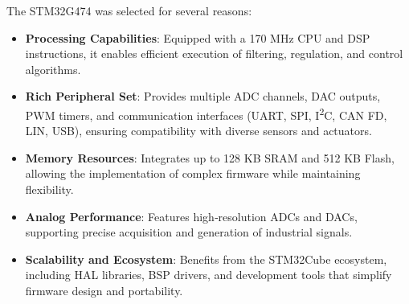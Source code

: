 The STM32G474 was selected for several reasons:
\begin{itemize}
    \item \textbf{Processing Capabilities}: Equipped with a 170 MHz CPU and DSP
    instructions, it enables efficient execution of filtering, regulation, and control
    algorithms.
    \item \textbf{Rich Peripheral Set}: Provides multiple ADC channels, DAC outputs,
    PWM timers, and communication interfaces (UART, SPI, I\textsuperscript{2}C, CAN FD,
    LIN, USB), ensuring compatibility with diverse sensors and actuators.
    \item \textbf{Memory Resources}: Integrates up to 128 KB SRAM and 512 KB Flash,
    allowing the implementation of complex firmware while maintaining flexibility.
    \item \textbf{Analog Performance}: Features high‑resolution ADCs and DACs,
    supporting precise acquisition and generation of industrial signals.
    \item \textbf{Scalability and Ecosystem}: Benefits from the STM32Cube ecosystem,
    including HAL libraries, BSP drivers, and development tools that simplify firmware
    design and portability.
\end{itemize}

